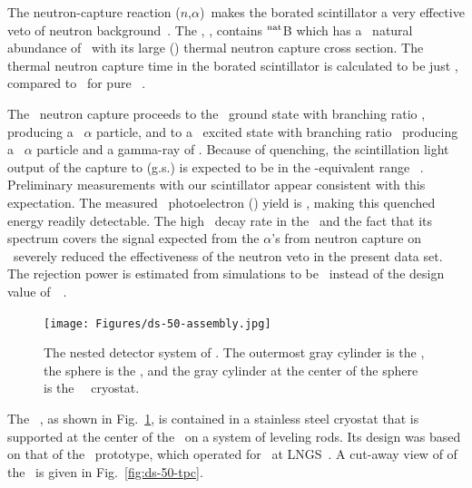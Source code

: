 The neutron-capture reaction \borten($n$,$\alpha$)\lith\ makes the borated scintillator a very effective veto of neutron background~\cite{wright}.   The \tmb, \tmbchem, contains $^{\rm nat}$B which has a \abborten\ natural abundance of \borten\ with its large (\lsvbtenxsec) thermal neutron capture cross section.  The thermal neutron capture time in the borated scintillator is calculated to be just \lsvtmbfiftypercentcapturetime, compared to \lsvtmbzeropercentcapturetime\ for pure \pc~\cite{bx:detector}.  


The \borten\ neutron capture proceeds to the \lith\ ground state with branching ratio \brbortenground, producing a \enbortengroundalpha\ $\alpha$ particle, and to a \lith\ excited state with branching ratio \brbortenexcited\, producing a \enbortenexcitedalpha\ $\alpha$ particle and a gamma-ray of \enbortenexcitedgamma.  Because of quenching, the scintillation light output of the capture to \lith(g.s.) is expected to be in the \bg-equivalent range \lsvalphaequivenergy~\cite{greenwood,wang}.  
Preliminary measurements with our scintillator appear consistent with this expectation.
The measured \lsv\ photoelectron (\si{\pe}) yield is \lsvly, making this quenched energy readily detectable.  The high \cfor\ decay rate in the \lsv\ and the fact that its spectrum covers the signal expected from the $\alpha$'s from neutron capture on \borten\ severely reduced the effectiveness of the neutron veto in the present data set.  The rejection power is estimated from simulations to be \odneutronrejectionachieved\ instead of the design value of~\odneutronrejectiondesign~\cite{wright}.

\begin{figure}[t!]
\begin{center}
\texttt{[image: Figures/ds-50-assembly.jpg]}
\caption{The nested detector system of \dsf. The outermost gray cylinder is the \wcd, the sphere is the \lsv, and the gray cylinder at the center of the sphere is the \lar\ \tpc\ cryostat.}
\label{fig:ds-50-detectors}
\end{center}
\end{figure}

The \dsf\ \tpc, as shown in Fig.~\ref{fig:ds-50-detectors}, is contained in a stainless steel cryostat that is supported at  the center of the \lsv\ on a system of leveling rods.  Its design was based on that of the \dst\ prototype, which operated for \dstexp\ at LNGS~\cite{ds:ds-10-run3}. 
A cut-away view of of the \tpc\ is given in Fig.~\ref{fig:ds-50-tpc}.

